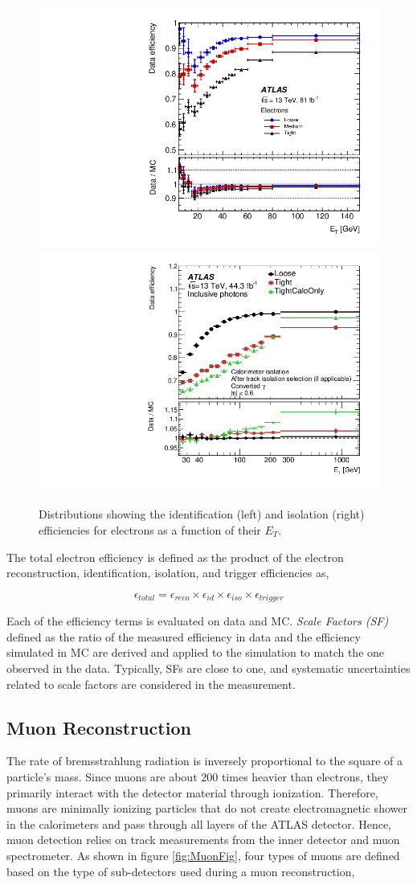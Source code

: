 \begin{figure}
    \centering
    \includegraphics[width=.49\linewidth]{figures/LHC/ElecIdent_Eff.png}
    \includegraphics[width=.49\linewidth]{figures/LHC/Elec_IsoEff.png}
    \caption{ Distributions showing the identification (left) and isolation (right) efficiencies for electrons as a function of their $E_{T}$\cite{ElectronReco}.\label{fig:ElecEff}}
\end{figure}

The total electron efficiency is defined as the product of the electron reconstruction, identification, isolation, and trigger efficiencies as, 

\begin{equation}
    \epsilon_{total} = \epsilon_{reco} \times \epsilon_{id} \times \epsilon_{iso} \times \epsilon_{trigger}     
\end{equation}

Each of the efficiency terms is evaluated on data and MC. \textit{Scale Factors (SF)} defined as the ratio of the measured efficiency in data and the efficiency simulated in MC are derived and applied to the simulation to match the one observed in the data. Typically, SFs are close to one, and systematic uncertainties related to scale factors are considered in the measurement.

\subsection{Muon Reconstruction}
\label{subsec:ParticleRecon_Muon}
The rate of bremsstrahlung radiation is inversely proportional to the square of a particle's mass. Since muons are about $200$ times heavier than electrons, they primarily interact with the detector material through ionization. Therefore, muons are minimally ionizing particles that do not create electromagnetic shower in the calorimeters and pass through all layers of the ATLAS detector. Hence, muon detection relies on track measurements from the inner detector and muon spectrometer. As shown in figure \ref{fig:MuonFig}, four types of muons are defined based on the type of sub-detectors used during a muon reconstruction,


